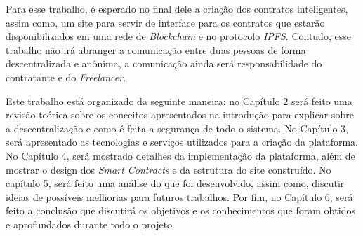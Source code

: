 Para esse trabalho, é esperado no final dele a criação dos contratos inteligentes, assim como, um site para servir de interface para os contratos que estarão disponibilizados em uma rede de \textit{Blockchain} e no protocolo \textit{IPFS}. Contudo, esse trabalho não irá abranger a comunicação entre duas pessoas de forma descentralizada e anônima, a comunicação ainda será responsabilidade do contratante e do \textit{Freelancer}.

Este trabalho está organizado da seguinte maneira: no Capítulo 2 será feito uma revisão teórica sobre os conceitos apresentados na introdução para explicar sobre a descentralização e como é feita a segurança de todo o sistema. No Capítulo 3, será apresentado as tecnologias e serviços utilizados para a criação da plataforma. No Capítulo 4, será mostrado detalhes da implementação da plataforma, além de mostrar o design dos \textit{Smart Contracts} e da estrutura do site construído. No capítulo 5, será feito uma análise do que foi desenvolvido, assim como, discutir ideias de possíveis melhorias para futuros trabalhos. Por fim, no Capítulo 6, será feito a conclusão que discutirá os objetivos e os conhecimentos que foram obtidos e aprofundados durante todo o projeto.
